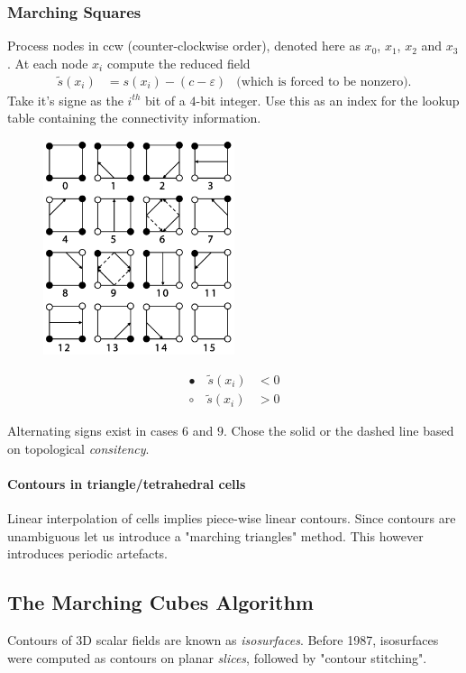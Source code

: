 \subsubsection{Marching Squares}
Process nodes in ccw (counter-clockwise order), denoted here as $x_0$, $x_1$, $x_2$ and $x_3$. At each node $x_i$ compute the reduced field
\begin{align*}
    \tilde s (x_i) &= s(x_i) - (c-\varepsilon) &\text{(which is forced to be nonzero)}.
\end{align*}
Take it's signe as the $i^{th}$ bit of a $4$-bit integer. Use this as an index for the lookup table containing the connectivity information.
\begin{figure}[H]
    \centering
    \includegraphics[width=0.5\textwidth]{img/02_marching_squares}
\end{figure}
\begin{align*}
   \bullet\quad \tilde s(x_i) &<0\\
   \circ\quad \tilde s(x_i) &>0
\end{align*}

Alternating signs exist in cases $6$ and $9$. Chose the solid or the dashed line based on topological \emph{consitency}.

\paragraph{Contours in triangle/tetrahedral cells} Linear interpolation of cells implies piece-wise linear contours. Since contours are unambiguous let us introduce a "marching triangles" method. This however introduces periodic artefacts.

\subsection{The Marching Cubes Algorithm}
Contours of $3$D scalar fields are known as \emph{isosurfaces}. Before 1987, isosurfaces were computed as contours on planar \emph{slices}, followed by "contour stitching".


